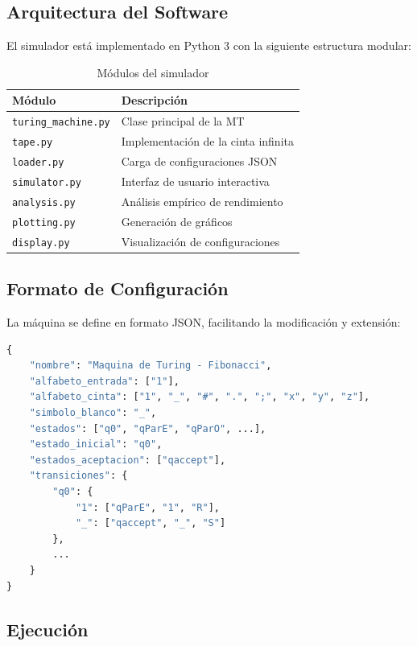 \documentclass[12pt,a4paper]{article}
\begin{document}
\subsection{Arquitectura del Software}

El simulador está implementado en Python 3 con la siguiente estructura modular:

\begin{table}[H]
\centering
\begin{tabular}{lp{9cm}}
\toprule
\textbf{Módulo} & \textbf{Descripción} \\
\midrule
\texttt{turing\_machine.py} & Clase principal de la MT \\
\texttt{tape.py} & Implementación de la cinta infinita \\
\texttt{loader.py} & Carga de configuraciones JSON \\
\texttt{simulator.py} & Interfaz de usuario interactiva \\
\texttt{analysis.py} & Análisis empírico de rendimiento \\
\texttt{plotting.py} & Generación de gráficos \\
\texttt{display.py} & Visualización de configuraciones \\
\bottomrule
\end{tabular}
\caption{Módulos del simulador}
\end{table}

\subsection{Formato de Configuración}

La máquina se define en formato JSON, facilitando la modificación y extensión:

\begin{lstlisting}[language=Python,caption={Fragmento de fibonacci.json}]
{
    "nombre": "Maquina de Turing - Fibonacci",
    "alfabeto_entrada": ["1"],
    "alfabeto_cinta": ["1", "_", "#", ".", ";", "x", "y", "z"],
    "simbolo_blanco": "_",
    "estados": ["q0", "qParE", "qParO", ...],
    "estado_inicial": "q0",
    "estados_aceptacion": ["qaccept"],
    "transiciones": {
        "q0": {
            "1": ["qParE", "1", "R"],
            "_": ["qaccept", "_", "S"]
        },
        ...
    }
}
\end{lstlisting}

\subsection{Ejecución}
\end{document}
